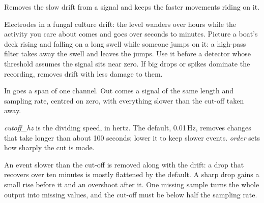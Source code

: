 Removes the slow drift from a signal and keeps the faster movements riding on it.

Electrodes in a fungal culture drift: the level wanders over hours while the activity you care
about comes and goes over seconds to minutes. Picture a boat's deck rising and falling on a
long swell while someone jumps on it: a high-pass filter takes away the swell and leaves the
jumps. Use it before a detector whose threshold assumes the signal sits near zero. If big drops
or spikes dominate the recording,  removes drift with less damage
to them.

In goes a span of one channel. Out comes a signal of the same length and sampling rate, centred
on zero, with everything slower than the cut-off taken away.

\emph{cutoff\_hz} is the dividing speed, in hertz. The default, 0.01\,Hz, removes changes
that take longer than about 100 seconds; lower it to keep slower events. \emph{order} sets
how sharply the cut is made.

An event slower than the cut-off is removed along with the drift: a drop that recovers over
ten minutes is mostly flattened by the default. A sharp drop gains a small rise before it and
an overshoot after it. One missing sample turns the whole output into missing values, and the
cut-off must be below half the sampling rate.
